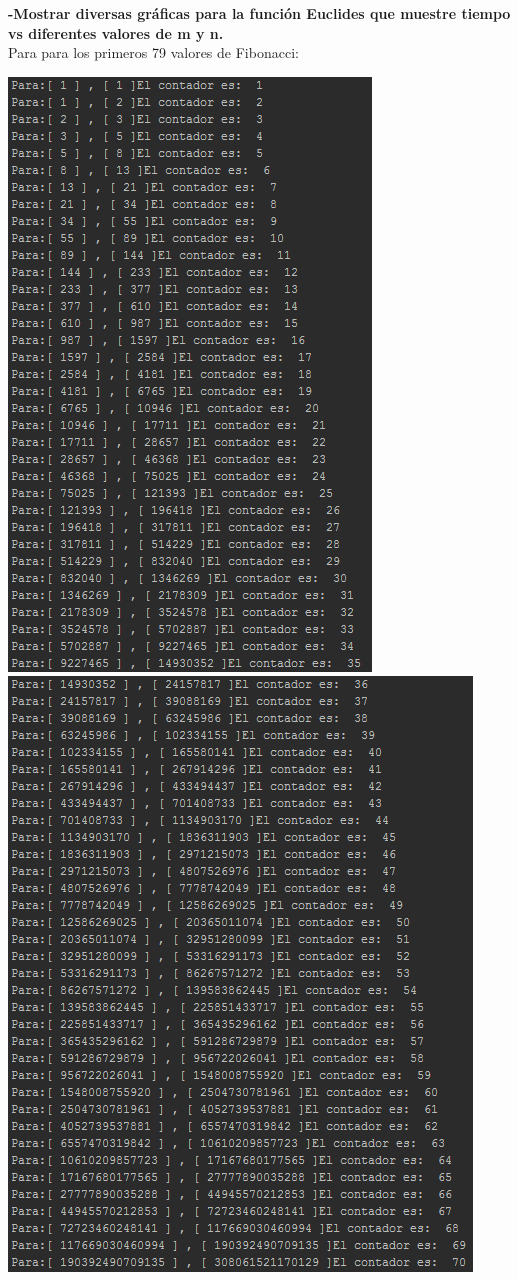 \documentclass[spanish]{article}
\begin{document}
{	{\large{\bf -Mostrar diversas gráficas para la función Euclides que muestre tiempo vs diferentes valores de m y n.}}\\
	Para para los primeros 79 valores de Fibonacci:
	\begin{center}
		\includegraphics{fibo1}\\
		\includegraphics{fibo2}\\

\end{center}}
\end{document}
